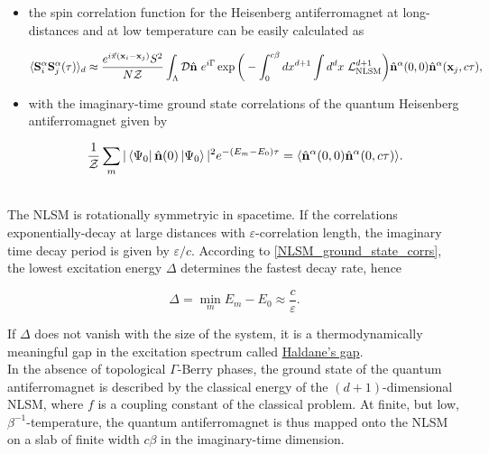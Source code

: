 \begin{itemize}
    \item the spin correlation function for the Heisenberg antiferromagnet at long-distances and at low temperature can be easily calculated as 

    \begin{equation}
         \langle {\bf S}_i^{\alpha} {\bf S}_{j}^{\alpha}(\tau) \rangle_d \approx \frac{e^{i \vec{\pi} ({\bf x}_i -{\bf x}_j)} S^2}{N \mathcal{Z}} \int_{\Lambda} \mathcal{D} \hat{{\bf n}} \textnormal{ }  e^{i\Gamma} \exp \bigg(- \int_0^{c\beta} dx^{d+1} \int d^dx \textnormal{ } \mathcal{L}^{d+1}_{\textnormal{NLSM}}\bigg) \hat{\bf n}^{\alpha}(0,0) \hat{\bf n}^{\alpha}({\bf x}_j,c\tau),
        \end{equation}

\item  with  the imaginary-time ground state correlations of the            quantum Heisenberg antiferromagnet given by  
        
        \begin{equation}
            \frac{1}{\mathcal{Z}} \sum_{m} |\bra{\Psi_0} \hat{\bf n}(0) \ket{\Psi_0}|^2 e^{-(E_m - E_0)\tau} = \langle \hat{\bf n}^{\alpha}(0,0) \hat{\bf n}^{\alpha}(0,c\tau) \rangle.
            \label{NLSM_ground_state_corrs}
        \end{equation}
\end{itemize}
 \blanky \\
 
 The NLSM is rotationally symmetryic in spacetime. If the correlations exponentially-decay at large distances with $\varepsilon$-correlation length, the imaginary time decay period is given by $\varepsilon/c$. According to \cref{NLSM_ground_state_corrs}, the lowest excitation energy $\Delta$ determines the fastest decay rate, hence 
 
 $$
    \Delta = \min_{m} E_m - E_0 \approx \frac{c}{\varepsilon}.
 $$

If $\Delta$ does not vanish with the size of the system, it is a thermodynamically meaningful gap in the excitation spectrum called \underline{Haldane's gap}. \\

In the absence of topological $\Gamma$-Berry phases, the ground state of the quantum antiferromagnet is described by the classical energy of the $(d+1)$-dimensional NLSM, where $f$ is a coupling constant of the classical problem. At finite, but low, $\beta^{-1}$-temperature, the quantum antiferromagnet is thus mapped onto the NLSM on a slab of finite width $c\beta$ in the imaginary-time dimension. 

